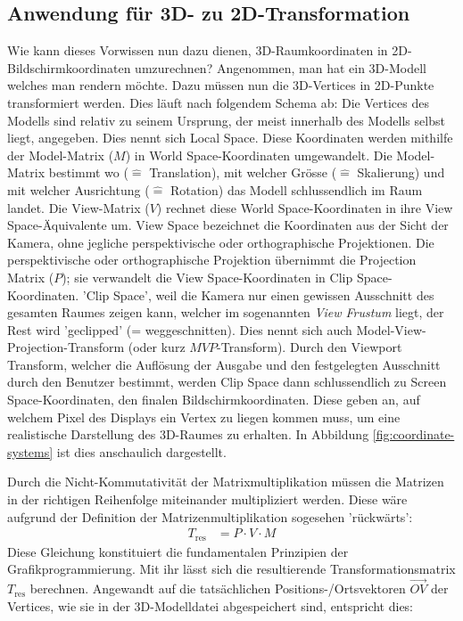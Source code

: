 \documentclass[titlepage, 11pt, a4paper, ngerman]{article}
\begin{document}
\subsection{Anwendung für 3D- zu 2D-Transformation}
Wie kann dieses Vorwissen nun dazu dienen, 3D-Raumkoordinaten in 2D-Bildschirmkoordinaten umzurechnen? Angenommen, man hat ein 3D-Modell welches man rendern möchte. Dazu müssen nun die 3D-\gls{Vertices} in 2D-Punkte transformiert werden. Dies läuft nach folgendem Schema ab: Die \gls{Vertices} des Modells sind relativ zu seinem Ursprung, der meist innerhalb des Modells selbst liegt, angegeben. Dies nennt sich Local Space. Diese Koordinaten werden mithilfe der Model-Matrix ($M$) in World Space-Koordinaten umgewandelt. Die Model-Matrix bestimmt wo ($\widehat{=}$ Translation), mit welcher Grösse ($\widehat{=}$ Skalierung) und mit welcher Ausrichtung ($\widehat{=}$ Rotation) das Modell schlussendlich im Raum landet. Die View-Matrix ($V$) rechnet diese World Space-Koordinaten in ihre View Space-Äquivalente um. View Space bezeichnet die Koordinaten aus der Sicht der Kamera, ohne jegliche perspektivische oder orthographische Projektionen. Die perspektivische oder orthographische Projektion übernimmt die Projection Matrix ($P$); sie verwandelt die View Space-Koordinaten in Clip Space-Koordinaten. 'Clip Space', weil die Kamera nur einen gewissen Ausschnitt des gesamten Raumes zeigen kann, welcher im sogenannten \textit{View Frustum} liegt, der Rest wird 'geclipped' (= weggeschnitten). Dies nennt sich auch Model-View-Projection-Transform (oder kurz $MVP$-Transform). Durch den Viewport Transform, welcher die Auflösung der Ausgabe und den festgelegten Ausschnitt durch den Benutzer bestimmt, werden Clip Space dann schlussendlich zu Screen Space-Koordinaten, den finalen Bildschirmkoordinaten. Diese geben an, auf welchem Pixel des Displays ein Vertex zu liegen kommen muss, um eine realistische Darstellung des 3D-Raumes zu erhalten. In Abbildung \ref{fig:coordinate-systems} ist dies anschaulich dargestellt.\par
Durch die Nicht-Kommutativität der Matrixmultiplikation müssen die Matrizen in der richtigen Reihenfolge miteinander multipliziert werden. Diese wäre aufgrund der Definition der Matrizenmultiplikation sogesehen 'rückwärts':
\begin{align*}
    T_{\text{res}} &= P \cdot V \cdot M
\end{align*}
\bigbreak
Diese Gleichung konstituiert die fundamentalen Prinzipien der Grafikprogrammierung. Mit ihr lässt sich die resultierende Transformationsmatrix $T_{\text{res}}$ berechnen. Angewandt auf die tatsächlichen Positions-/Ortsvektoren $\vec{OV}$ der \gls{Vertices}, wie sie in der 3D-Modelldatei abgespeichert sind, entspricht dies:
\end{document}
